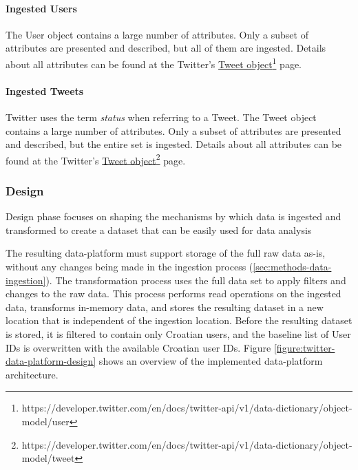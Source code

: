 


\paragraph{Ingested Users} The User object contains a large number of attributes. Only a subset of attributes are presented and described, but all of them are ingested. Details about all attributes can be found at the Twitter's \href{https://developer.twitter.com/en/docs/twitter-api/v1/data-dictionary/object-model/user}{Tweet object}\footnote{https://developer.twitter.com/en/docs/twitter-api/v1/data-dictionary/object-model/user} page.

\clearpage


\clearpage
\paragraph{Ingested Tweets} Twitter uses the term \textit{status} when referring to a Tweet. The Tweet object contains a large number of attributes. Only a subset of attributes are presented and described, but the entire set is ingested. Details about all attributes can be found at the Twitter's \href{https://developer.twitter.com/en/docs/twitter-api/v1/data-dictionary/object-model/tweet}{Tweet object}\footnote{https://developer.twitter.com/en/docs/twitter-api/v1/data-dictionary/object-model/tweet} page.




\clearpage
\subsubsection{Design}
\label{subsec:sdlc-design}

Design phase focuses on shaping the mechanisms by which data is ingested and transformed to create a dataset that can be easily used for data analysis 

The resulting \gls{data-platform} must support storage of the full raw data as-is, without any changes being made in the ingestion process (\ref{sec:methods-data-ingestion}). The transformation process uses the full data set to apply filters and changes to the raw data. This process performs read operations on the ingested data, transforms \gls{in-memory} data, and stores the resulting dataset in a new location that is independent of the ingestion location. Before the resulting dataset is stored, it is filtered to contain only Croatian users, and the baseline list of User IDs is overwritten with the available Croatian user IDs. Figure \ref{figure:twitter-data-platform-design} shows an overview of the implemented \gls{data-platform} architecture.

